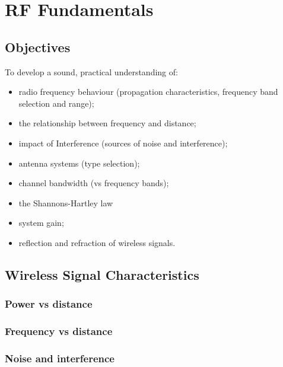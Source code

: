 \chapter{RF Fundamentals}\label{fundamentals}

\minitoc 

\clearpage
\section*{Objectives}
To develop a sound, practical understanding of:
\begin{itemize}

\item radio frequency behaviour (propagation characteristics, frequency band selection and range);

\item the relationship between frequency and distance;

\item impact of Interference (sources of noise and interference);

\item antenna systems (type selection);

\item channel bandwidth (vs frequency bands);

\item the Shannons-Hartley law
 
\item system gain; 

\item reflection and refraction of wireless signals.

\end{itemize}

\section{Wireless Signal Characteristics}

\subsection{Power vs distance}

\subsection{Frequency vs distance}

\subsection{Noise and interference}

